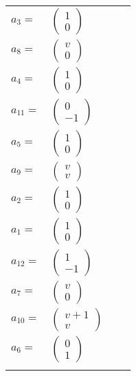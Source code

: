 \documentclass[1p]{elsarticle_modified}
\theoremstyle{definition}
\begin{document}
\begin{tabular}{m{7pt} m{180pt} m{7pt} m{180pt} }
\flushright $a_{3}=$&$\begin{pmatrix}1\\0\end{pmatrix}$ \\
\flushright $a_{8}=$&$\begin{pmatrix}v\\0\end{pmatrix}$ \\
\flushright $a_{4}=$&$\begin{pmatrix}1\\0\end{pmatrix}$ \\
\flushright $a_{11}=$&$\begin{pmatrix}0\\-1\end{pmatrix}$ \\
\flushright $a_{5}=$&$\begin{pmatrix}1\\0\end{pmatrix}$ \\
\flushright $a_{9}=$&$\begin{pmatrix}v\\v\end{pmatrix}$ \\
\flushright $a_{2}=$&$\begin{pmatrix}1\\0\end{pmatrix}$ \\
\flushright $a_{1}=$&$\begin{pmatrix}1\\0\end{pmatrix}$ \\
\flushright $a_{12}=$&$\begin{pmatrix}1\\-1\end{pmatrix}$ \\
\flushright $a_{7}=$&$\begin{pmatrix}v\\0\end{pmatrix}$ \\
\flushright $a_{10}=$&$\begin{pmatrix}v+1\\v\end{pmatrix}$ \\
\flushright $a_{6}=$&$\begin{pmatrix}0\\1\end{pmatrix}$\\&\end{tabular}
\end{document}
